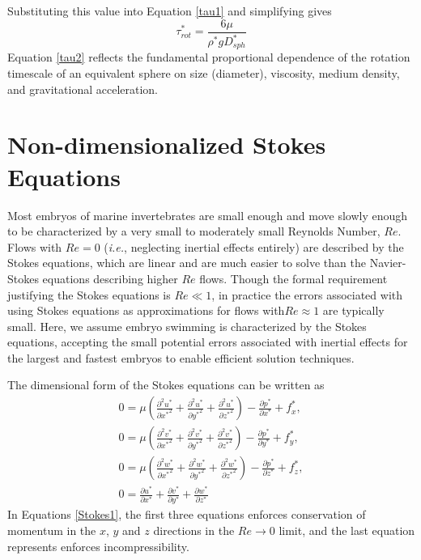 \documentclass[10pt,a4paper]{article}
\def\non{\nonumber}
\def\p{\partial}
\begin{document}
Substituting this value into Equation \ref{tau1} and simplifying gives
\begin{equation}\label{tau2}
	\tau_{rot}^* = \frac{6 \mu}{\rho^* g D_{sph}^*}
\end{equation}
Equation \ref{tau2} reflects the fundamental proportional dependence of the rotation timescale of an equivalent sphere on size (diameter), viscosity, medium density, and gravitational acceleration.


\section{Non-dimensionalized Stokes Equations}\label{NDStokesSect}
Most embryos of marine invertebrates are small enough and move slowly enough to be characterized by a very small to moderately small Reynolds Number, $Re$. 
Flows with $Re = 0$ (\textit{i.e.}, neglecting inertial effects entirely) are described by the Stokes equations, which are linear and are much easier to solve than the Navier-Stokes equations describing higher $Re$ flows.
Though the formal requirement justifying the Stokes equations is $Re \ll 1$, in practice the errors associated with using Stokes equations as approximations for flows with$Re \approx 1$ are typically small.
Here, we assume embryo swimming is characterized by the Stokes equations, accepting the small potential errors associated with inertial effects for the largest and fastest embryos to enable efficient solution techniques.

The dimensional form of the Stokes equations can be written as
\begin{eqnarray}\label{Stokes1}
	0 = \mu \left( \frac{\p^2 u^*}{\p {x^*}^2}+\frac{\p^2 u^*}{\p {y^*}^2}+\frac{\p^2 u^*}{\p {z^*}^2} \right) - \frac{\p p^*}{\p {x^*}} + f_x^*, \non \\
	0 = \mu \left( \frac{\p^2 v^*}{\p {x^*}^2}+\frac{\p^2 v^*}{\p {y^*}^2}+\frac{\p^2 v^*}{\p {z^*}^2} \right) - \frac{\p p^*}{\p {y^*}} + f_y^*, \non \\
	0 = \mu \left( \frac{\p^2 w^*}{\p {x^*}^2}+\frac{\p^2 w^*}{\p {y^*}^2}+\frac{\p^2 w^*}{\p {z^*}^2} \right) - \frac{\p p^*}{\p {z^*}} + f_z^*, \non \\
	0 =  \frac{\p u^*}{\p {x^*}}+\frac{\p v^*}{\p {y^*}}+\frac{\p w^*}{\p {z^*}} 
\end{eqnarray}
In Equations \ref{Stokes1}, the first three equations enforces conservation of momentum in the $x$, $y$ and $z$ directions in the $Re \rightarrow 0$ limit, and the last equation represents enforces incompressibility.
\end{document}
